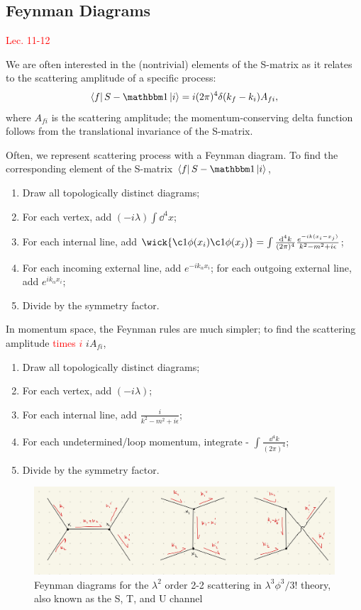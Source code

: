 \documentclass{article}
\begin{document}
\subsection{Feynman Diagrams}
\textcolor{red}{Lec. 11-12}

We are often interested in the (nontrivial) elements of the S-matrix as it relates to the scattering amplitude of a specific process:
$$\bra fS-\mathbbm 1\ket i=i(2\pi)^4\delta(k_f-k_i)A_{fi},$$
where $A_{fi}$ is the scattering amplitude; the momentum-conserving delta function follows from the translational invariance of the S-matrix.

Often, we represent scattering process with a Feynman diagram. To find the corresponding element of the S-matrix $\bra fS-\mathbbm 1\ket i$, 
\begin{enumerate}
    \item Draw all topologically distinct diagrams;
    \item For each vertex, add $(-i\lambda)\int\dd^4x$;
    \item For each internal line, add $\wick{\c1\phi(x_i)\c1\phi(x_j)}=\int\frac{\dd^4k}{(2\pi)^4}\frac{e^{-ik(x_i-x_j)}}{k^2-m^2+i\epsilon}$;
    \item For each incoming external line, add $e^{-ik_\alpha x_i}$; for each outgoing external line, add $e^{ik_\alpha x_i}$;
    \item Divide by the symmetry factor.
\end{enumerate}
In momentum space, the Feynman rules are much simpler; to find the scattering amplitude \textcolor{red}{times $i$} $iA_{fi}$, 
\begin{enumerate}
    \item Draw all topologically distinct diagrams;
    \item For each vertex, add $(-i\lambda)$;
    \item For each internal line, add $\frac{i}{k^2-m^2+i\epsilon}$;
    \item For each undetermined/loop momentum, integrate - $\int\frac{\dd^4k}{(2\pi)^4}$;
    \item Divide by the symmetry factor.
\end{enumerate}

\begin{figure}[h]
    \centering
    \includegraphics[width=0.95\linewidth]{images/qft-images/stuchannels.jpg}
    \caption{Feynman diagrams for the $\lambda^2$ order 2-2 scattering in $\lambda^3\phi^3/3!$ theory, also known as the S, T, and U channel}
    \label{fig:stuchannels}
\end{figure}
\end{document}
